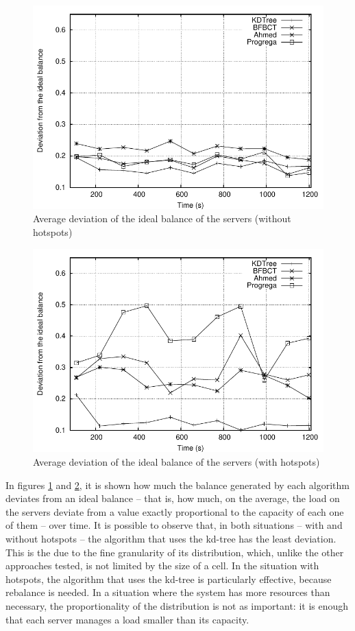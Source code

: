 \documentclass[acmjacm]{acmtrans2m}
\begin{document}
\begin{figure}[!t]
	\centering
	\includegraphics[width=0.8\linewidth]{images/usagedeviation_uniform}
	\caption{Average deviation of the ideal balance of the servers (without hotspots)}
	\label{fig:usagedeviation:uniform}
\end{figure}

\begin{figure}[!t]
	\centering
	\includegraphics[width=0.8\linewidth]{images/usagedeviation_hotspots}
	\caption{Average deviation of the ideal balance of the servers (with hotspots)}
	\label{fig:usagedeviation:hotspots}
\end{figure}

In figures \ref{fig:usagedeviation:uniform} and \ref{fig:usagedeviation:hotspots}, it is shown how much the balance generated by each algorithm deviates from an ideal balance -- that is, how much, on the average, the load on the servers deviate from a value exactly proportional to the capacity of each one of them -- over time. It is possible to observe that, in both situations -- with and without hotspots -- the algorithm that uses the kd-tree has the least deviation. This is the due to the fine granularity of its distribution, which, unlike the other approaches tested, is not limited by the size of a cell. In the situation with hotspots, the algorithm that uses the kd-tree is particularly effective, because rebalance is needed. In a situation where the system has more resources than necessary, the proportionality of the distribution is not as important: it is enough that each server manages a load smaller than its capacity.
\end{document}
